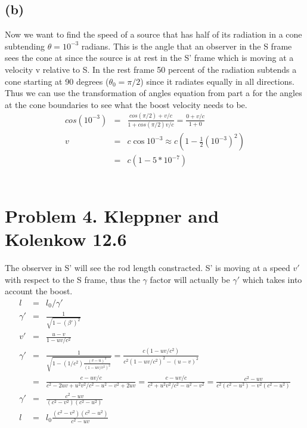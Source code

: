 \documentclass[11pt]{amsart}
\begin{document}
\subsection*{(b)} Now we want to find the speed of a source that has half of its radiation in a cone subtending $\theta =10^{-3}$ radians. This is the angle that an observer in the S frame sees the cone at since the source is at rest in the S' frame which is moving at a velocity v relative to S. In the rest frame 50 percent of the radiation subtends a cone starting at 90 degrees ($\theta_{0}=\pi/2$) since it radiates equally in all directions. Thus we can use the transformation of angles equation from part a for the angles at the cone boundaries to see what the boost velocity needs to be. \\
\begin{eqnarray*}
cos(10^{-3}) &=& \frac{cos(\pi/2)+v/c}{1+cos(\pi/2)v/c} = \frac{0+v/c}{1+0} \\
v &=& c\cos{10^{-3}} \approx c(1-\frac{1}{2}(10^{-3})^{2}) \\
&=& c(1-5*10^{-7}) 
\end{eqnarray*} \\

\section*{Problem 4. Kleppner and Kolenkow 12.6}
The observer in S' will see the rod length constracted. S' is moving at a speed $v'$ with respect to the S frame, thus the $\gamma$ factor will actually be $\gamma'$ which takes into account the boost. \\
\begin{eqnarray*}
l &=& l_{0}/\gamma' \\
\gamma' &=& \frac{1}{\sqrt{1-(\beta')^{2}}} \\
v' &=& \frac{u-v}{1-uv/c^{2}} \\
\gamma' &=& \frac{1}{\sqrt{1-(1/c^{2})\frac{(v-u)^{2}}{(1-uv/c^{2})^{2}}}} = \frac{c(1-uv/c^{2})}{c^{2}(1-uv/c^{2})^{2}-(u-v)^{2}} \\
&=& \frac{c-uv/c}{c^{2}-2uv+u^{2}v^{2}/c^{2}-u^{2}-v^{2}+2uv} = \frac{c-uv/c}{c^{2}+u^{2}v^{2}/c^{2}-u^{2}-v^{2}} = \frac{c^{2}-uv}{c^{2}(c^{2}-u^{2})-v^{2}(c^{2}-u^{2})} \\
\gamma' &=& \frac{c^{2}-uv}{(c^{2}-v^{2})(c^{2}-u^{2})} \\
l &=& l_{0}\frac{(c^{2}-v^{2})(c^{2}-u^{2})}{c^{2}-uv} 
\end{eqnarray*} \\ 
\end{document}
